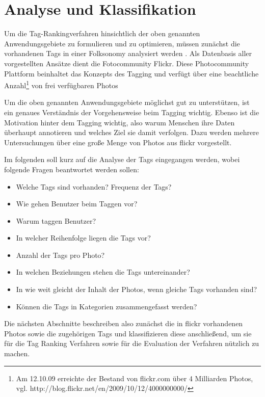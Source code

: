 \section{Analyse und Klassifikation} %
\label{sec:analyse_und_klassifikation}

Um die Tag-Rankingverfahren hinsichtlich der oben genannten Anwendungsgebiete zu formulieren und zu optimieren, müssen zunächst die vorhandenen Tags in einer Folksonomy analysiert werden \cite{collectiveKnowledge}. Als Datenbasis aller vorgestellten Ansätze dient die Fotocommunity Flickr. Diese Photocommunity Plattform beinhaltet das Konzepts des Tagging und verfügt über eine beachtliche Anzahl\footnote{Am 12.10.09 erreichte der Bestand von flickr.com über 4 Milliarden Photos, vgl. http://blog.flickr.net/en/2009/10/12/4000000000/ } von frei verfügbaren Photos


Um die oben genannten Anwendungsgebiete möglichst gut zu unterstützen, ist ein genaues Verständnis der Vorgehensweise beim Tagging wichtig. Ebenso ist die Motivation hinter dem Tagging wichtig, also warum Menschen ihre Daten überhaupt annotieren und welches Ziel sie damit verfolgen. Dazu werden mehrere Untersuchungen über eine große Menge von Photos aus flickr vorgestellt.

Im folgenden soll kurz auf die Analyse der Tags eingegangen werden, wobei folgende Fragen beantwortet werden sollen:
\begin{itemize}
	\item     Welche Tags sind vorhanden? Frequenz der Tags?
	\item     Wie gehen Benutzer beim Taggen vor?
	\item     Warum taggen Benutzer?
	\item     In welcher Reihenfolge liegen die Tags vor?
  \item     Anzahl der Tags pro Photo?
	\item     In welchen Beziehungen stehen die Tags untereinander?
	\item     In wie weit gleicht der Inhalt der Photos, wenn gleiche Tags vorhanden sind?
	\item     Können die Tags in Kategorien zusammengefasst werden?
\end{itemize}

Die nächsten Abschnitte beschreiben also zunächst die in flickr vorhandenen Photos sowie die zugehörigen Tags und klassifizieren diese anschließend, um sie für die Tag Ranking Verfahren sowie für die Evaluation der Verfahren nützlich zu machen.

